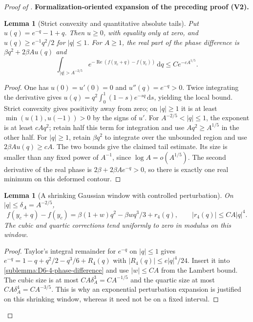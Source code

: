 \documentclass[11pt]{article}
\newtheorem{lemma}[theorem]{Lemma}
\newcommand{\formalisationparentid}{X}
\newenvironment{formalisationaddition}[1]{\par\medskip\begingroup\color{blue}\def\formalisationparentid{#1}\setcounter{formalizationsublemma}{0}\let\lemma\formalizationsublemma\let\endlemma\endformalizationsublemma
  \def\Eo{\mathcal E_h^\circ}\def\EE{\mathcal E_h}\def\phio{\phi_h^\circ}\def\phih{\phi_h}\def\Ho{H_h^{\rm atom}(v^\circ)}\def\Ha{H_h^{\rm atom}}\def\HL{H_h^{L}}\def\Dh{D_h}\def\Log{\operatorname{Log}}\def\ellh{\ell_h}\def\Gp{G_{p,h}}\def\Ast{A_{*,h}}\def\ahat{\widehat{\mathfrak a}_h}\def\ah{\mathfrak a_h}\def\rh{\widehat\rho_h}\def\deltah{\widehat\delta_h}\def\oldref##1{\textup{(##1)}}\def\interface##1{\par\noindent\textit{Analytical interface used here.} ##1\par}\def\finish{\par\noindent\textit{Conclusion of the formalization-oriented expansion.} }\par\noindent\textbf{Formalization-oriented expansion of the preceding proof (V2).}\par\smallskip
}{\par\endgroup\medskip
}
\newcommand{\Rea}{\operatorname{Re}}
\begin{document}
\begin{proof}[Proof of ]
\begin{formalisationaddition}{D-T6.4}
\begin{lemma}[Strict convexity and quantitative absolute tails]\label{sublemma:D6-4-real-phase-bounds}
Put $u(q)=e^{-q}-1+q$. Then $u\ge0$, with equality only at zero, and
$u(q)\ge e^{-1}q^2/2$ for $|q|\le1$.
For $A\ge1$, the real part of the phase difference is
$\beta q^2+2\beta A u(q)$ and
\[
 \int_{|q|>A^{-2/5}}
 e^{-\Rea(f(y_c+q)-f(y_c))}\,\mathrm dq
                         \le C e^{-cA^{1/5}}.
\]
\end{lemma}
\begin{proof}
One has $u(0)=u'(0)=0$ and $u''(q)=e^{-q}>0$.
Twice integrating the derivative gives
$u(q)=q^2\int_0^1(1-s)e^{-sq}\,\mathrm ds$, yielding the local bound.
Strict convexity gives positivity away from zero; on $|q|\ge1$ it is
at least $\min(u(1),u(-1))>0$ by the signs of $u'$.
For $A^{-2/5}<|q|\le1$, the exponent is at least $cAq^2$;
retain half this term for integration and use
$Aq^2\ge A^{1/5}$ in the other half.
For $|q|\ge1$, retain $\beta q^2$ to integrate over the unbounded
region and use $2\beta A u(q)\ge cA$.
The two bounds give the claimed tail estimate. Its size is smaller
than any fixed power of $A^{-1}$, since $\log A=o(A^{1/5})$.
The second derivative of the real phase is $2\beta+2\beta Ae^{-q}>0$,
so there is exactly one real minimum on this deformed contour.
\end{proof}

\begin{lemma}[A shrinking Gaussian window with controlled perturbation]\label{sublemma:D6-4-gaussian-window}
On $|q|\le\delta_A=A^{-2/5}$,
\[
 f(y_c+q)-f(y_c)=\beta(1+w)q^2-\beta wq^3/3+r_4(q),
 \qquad |r_4(q)|\le C A|q|^4.
\]
The cubic and quartic corrections tend uniformly to zero in modulus
on this window.
\end{lemma}
\begin{proof}
Taylor's integral remainder for $e^{-q}$ on $|q|\le1$ gives
$e^{-q}=1-q+q^2/2-q^3/6+R_4(q)$ with
$|R_4(q)|\le e|q|^4/24$.
Insert it into \ref{sublemma:D6-4-phase-difference} and use
$|w|\le CA$ from the Lambert bound.
The cubic size is at most $CA\delta_A^3=CA^{-1/5}$ and the
quartic size at most $CA\delta_A^4=CA^{-3/5}$.
This is why an exponential perturbation expansion is justified on
this shrinking window, whereas it need not be on a fixed interval.
\end{proof}


\end{formalisationaddition}
\end{proof}
\end{document}

